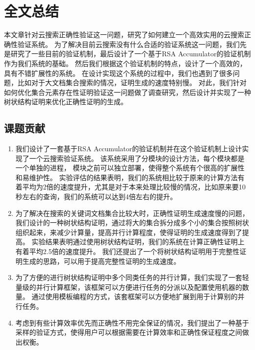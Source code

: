 \chapter{全文总结}
\label{chap:conclusion}

本文章针对云搜索正确性验证这一问题，研究了如何建立一个高效实用的云搜索正确性验证系统。
为了解决目前云搜索没有什么合适的验证系统这一问题，我们先是研究了一些目前的验证机制，最后设计了一个基于RSA Accumulator的验证机制作为我们系统的基础。
然后我们根据这个验证机制的特点，设计了一个高效的，具有不错扩展性的系统。
在设计实现这个系统的过程中，我们也遇到了很多问题，比如对于大文档集合搜索的情况，证明生成的速度特别慢。
对此，我们针对如何优化集合元素存在性证明验证这一问题做了调查研究，然后设计并实现了一种树状结构证明来优化正确性证明的生成。

\section{课题贡献}
\begin{enumerate}
\item 
我们设计了一套基于RSA Accumulator的验证机制并在这个验证机制上设计实现了一个云搜索验证系统。
该系统采用了分模块的设计方法，每个模块都是一个单独的进程，
模块之前可以独立部署，使得整个系统有个很高的扩展性和易维护性。
实验评估的结果表明，我们的系统相比较于原来的计算方法有着平均为2倍的速度提升，尤其是对于本来处理比较慢的情况，比如原来要10秒左右的查询，我们的系统可以达到4倍左右的提升。
\item
为了解决在搜索的关键词文档集合比较大时，正确性证明生成速度慢的问题，
我们设计的一种树状结构证明，通过将大的集合拆分成多个小的集合按照树状组织起来，来减少计算量，提高并行计算程度，使得证明的生成速度得到了提高。
实验结果表明通过使用树状结构证明，我们的系统在计算正确性证明上有着平均2.5倍的速度提升。
我们还提出了一个将树状结构证明用于完整性证明生成的思路，可以用于提高完整性证明的生成速度。
\item 
为了方便的进行树状结构证明中多个同类任务的并行计算，我们实现了一套轻量级的并行计算框架，该框架可以方便进行任务的分派以及配置使用机器的数量。
通过使用模板编程的方式，该套框架可以方便地扩展到用于计算别的并行任务。
\item
考虑到有些计算效率优先而正确性不用完全保证的情况，我们提出了一种基于采样的验证方式，使得用户可以根据需要在计算效率和正确性保证程度之间做出权衡。
\end{enumerate}

